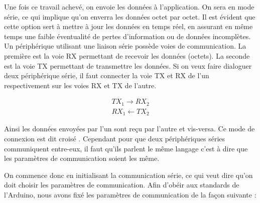 \documentclass{polytech/polytech}
\begin{document}

Une fois ce travail achevé, on envoie les données à l'application. On sera en mode série, ce qui implique qu'on enverra les données octet par octet. Il est évident que cette option sert à mettre à jour les données en temps réel, en assurant en même temps une faible éventualité de pertes d'information ou de données incomplètes.
Un périphérique utilisant une liaison série possède voies de communication. La première est la voie RX permettant de recevoir les données (octets). La seconde est la voie TX permettant de transmettre les données.  Si on veux faire dialoguer deux périphérique série, il faut connecter la voie TX et RX de l'un respectivement sur les voies RX et TX de l'autre.

\begin{eqnarray}
TX_1 \rightarrow RX_2
\\
RX_1 \leftarrow TX_2
\end{eqnarray}

Ainsi les données envoyées par l'un sont reçu par l'autre et vis-versa. Ce mode de connexion est dit \guillemotleft croisé \guillemotright .
Cependant pour que deux périphériques séries communiquent entre-eux, il faut qu'ils parlent le même langage c'est à dire que les paramètres de communication soient les même.

On commence donc en initialisant la communication série, ce qui veut dire qu'on doit choisir les paramètres de communication. Afin d'obéir aux standards de l'Arduino, nous avons fixé les paramètres de communication de la façon suivante :
\end{document}
